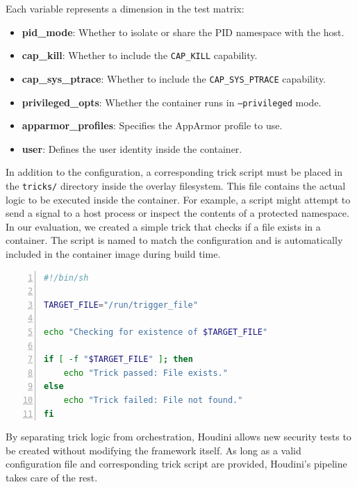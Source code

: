 \documentclass[12pt]{report}
\begin{document}
\begin{doublespace}
Each variable represents a dimension in the test matrix:
\begin{itemize}
\item \textbf{pid\_mode}: Whether to isolate or share the PID namespace with the host.
\item \textbf{cap\_kill}: Whether to include the \texttt{CAP\_KILL} capability.
\item \textbf{cap\_sys\_ptrace}: Whether to include the \texttt{CAP\_SYS\_PTRACE} capability.
\item \textbf{privileged\_opts}: Whether the container runs in \texttt{--privileged} mode.
\item \textbf{apparmor\_profiles}: Specifies the AppArmor profile to use.
\item \textbf{user}: Defines the user identity inside the container.
\end{itemize}


In addition to the configuration, a corresponding trick script must be placed in the \texttt{tricks/} directory inside the overlay filesystem. This file contains the actual logic to be executed inside the container. For example, a script might attempt to send a signal to a host process or inspect the contents of a protected namespace. In our evaluation, we created a simple trick that checks if a file exists in a container. The script is named to match the configuration and is automatically included in the container image during build time.

\begin{lstlisting}[language=bash, caption={Trick Configuration Parameters}, label={lst:escape-trick}, numbers=left, numberstyle=\tiny, stepnumber=1, frame=single, breaklines=true, backgroundcolor=\color{gray!10}, basicstyle=\ttfamily\footnotesize, showspaces=false, showstringspaces=false]
#!/bin/sh

TARGET_FILE="/run/trigger_file"

echo "Checking for existence of $TARGET_FILE"

if [ -f "$TARGET_FILE" ]; then
    echo "Trick passed: File exists."
else
    echo "Trick failed: File not found."
fi

\end{lstlisting}

By separating trick logic from orchestration, Houdini allows new security tests to be created without modifying the framework itself. As long as a valid configuration file and corresponding trick script are provided, Houdini’s pipeline takes care of the rest.


\end{doublespace}
\end{document}
